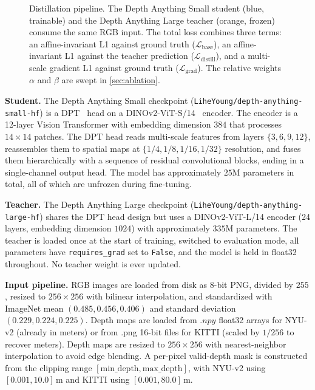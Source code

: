 \documentclass[10pt,twocolumn,letterpaper]{article}
\begin{document}
\begin{figure}[t]
\caption{Distillation pipeline. The Depth Anything Small student (blue,
trainable) and the Depth Anything Large teacher (orange, frozen) consume
the same RGB input. The total loss combines three terms: an
affine-invariant L1 against ground truth ($\mathcal{L}_{\text{base}}$),
an affine-invariant L1 against the teacher prediction
($\mathcal{L}_{\text{distill}}$), and a multi-scale gradient L1 against
ground truth ($\mathcal{L}_{\text{grad}}$). The relative weights
$\alpha$ and $\beta$ are swept in \cref{sec:ablation}.}
\label{fig:arch}
\end{figure}

\textbf{Student.} The Depth Anything Small checkpoint
(\texttt{LiheYoung/depth-anything-small-hf}) is a DPT~\cite{ranftl2021dpt}
head on a DINOv2-ViT-S/14~\cite{oquab2023dinov2,dosovitskiy2021vit}
encoder. The encoder is a 12-layer Vision Transformer with embedding
dimension $384$ that processes $14{\times}14$ patches. The DPT head reads
multi-scale features from layers $\{3, 6, 9, 12\}$, reassembles them to
spatial maps at $\{1/4, 1/8, 1/16, 1/32\}$ resolution, and fuses them
hierarchically with a sequence of residual convolutional blocks, ending
in a single-channel output head. The model has approximately $25$M
parameters in total, all of which are unfrozen during fine-tuning.

\textbf{Teacher.} The Depth Anything Large checkpoint
(\texttt{LiheYoung/depth-anything-large-hf}) shares the DPT head design
but uses a DINOv2-ViT-L/14 encoder (24 layers, embedding dimension
$1024$) with approximately $335$M parameters. The teacher is loaded
once at the start of training, switched to evaluation mode, all
parameters have \texttt{requires\_grad} set to \texttt{False}, and the
model is held in float32 throughout. No teacher weight is ever updated.

\textbf{Input pipeline.} RGB images are loaded from disk as 8-bit PNG,
divided by $255$, resized to $256{\times}256$ with bilinear
interpolation, and standardized with ImageNet mean
$(0.485, 0.456, 0.406)$ and standard deviation
$(0.229, 0.224, 0.225)$. Depth maps are loaded from $.npy$ float32
arrays for NYU-v2 (already in meters) or from .png 16-bit files for
KITTI (scaled by $1/256$ to recover meters). Depth maps are resized to
$256{\times}256$ with nearest-neighbor interpolation to avoid edge
blending. A per-pixel valid-depth mask is constructed from the
clipping range $[\text{min\_depth}, \text{max\_depth}]$, with
NYU-v2 using $[0.001, 10.0]$\,m and KITTI using $[0.001, 80.0]$\,m.
\end{document}
